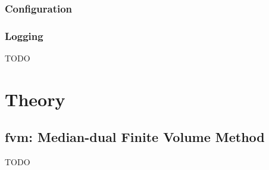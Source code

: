 \subsection{Configuration}


\subsection{Logging} \label{s:utilities-logging}
TODO

\chapter{Theory}
\section{fvm: Median-dual Finite Volume Method}
\label{s:fvm}
TODO



